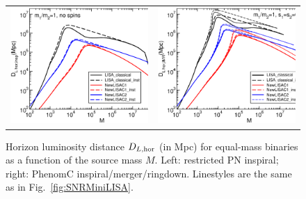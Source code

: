 \documentclass{iopart}
\begin{document}
%
\begin{figure}[H]
\begin{center}
\begin{tabular}{cc}
\includegraphics[scale=0.33,clip=true]{FigEmanuele/DLNewLISAinsp.eps}&
\includegraphics[scale=0.33,clip=true]{FigEmanuele/DLNewLISAIMR.eps}\\
\end{tabular}
\caption{\label{fig:DLMiniLISA} Horizon luminosity distance $D_{L, {\rm hor}}$
  (in Mpc) for equal-mass binaries as a function of the source mass $M$. Left:
  restricted PN inspiral; right: {\sc PhenomC}
  inspiral/merger/ringdown. Linestyles are the same as in
  Fig.~\ref{fig:SNRMiniLISA}.}
\end{center}
\end{figure}
%
\end{document}
